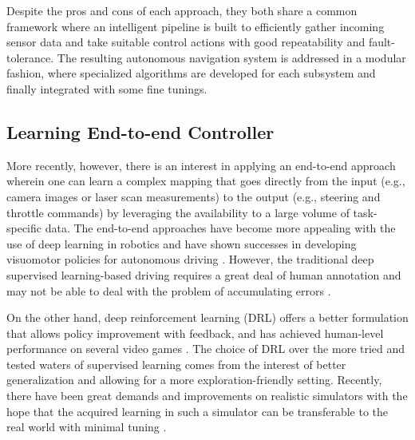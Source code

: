 \documentclass[../thesis.tex]{subfiles}
\begin{document}
 
Despite the pros and cons of each approach, they both share a common framework where an intelligent pipeline is built to efficiently gather incoming sensor data and take suitable control actions with good repeatability and fault-tolerance. 
The resulting autonomous navigation system is addressed in a modular fashion, where specialized algorithms are developed for each subsystem and finally integrated with some fine tunings.
 
 
\subsection{Learning End-to-end Controller}
 

 
More recently, however, there is an interest in applying an end-to-end approach wherein one can learn a complex mapping that goes directly from the input (e.g., camera images or laser scan measurements) to the output (e.g., steering and throttle commands) by leveraging the availability to a large volume of task-specific data. 
The end-to-end approaches have become more appealing with the use of deep learning in robotics and have shown successes in developing visuomotor policies for autonomous driving \cite{deepdriving,nvidiacar,endtoendcars}. 
However, the traditional deep supervised learning-based driving requires a great deal of human annotation and may not be able to deal with the problem of accumulating errors \cite{ross2011reduction}. 

On the other hand, deep reinforcement learning (DRL) offers a better formulation that allows policy improvement with feedback, and has achieved human-level performance on several video games \cite{mnih2013playing, mnih2015human,2016-TOG-deepRL}.
The choice of DRL over the more tried and tested waters of supervised learning comes from the interest of better generalization and allowing for a more exploration-friendly setting. 
Recently, there have been great demands and improvements on realistic simulators \cite{deepdrive,udacity} with the hope that the acquired learning in such a simulator can be transferable to the real world with minimal tuning \cite{you2017virtual}. 
 
\end{document}
